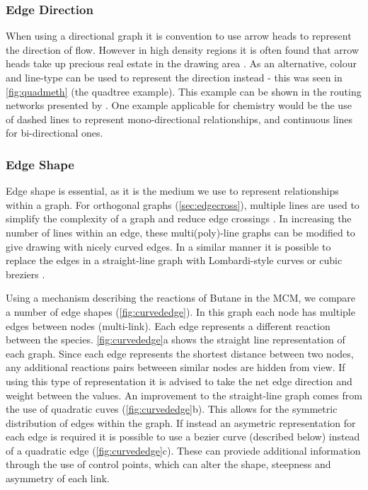 \subsubsection{Edge Direction}
When using a directional graph it is convention to use arrow heads to represent the direction of flow. However in high density regions it is often found that arrow heads take up precious real estate in the drawing area \citep{noarredge}. As an alternative, colour and line-type can be used to represent the direction instead - this was seen in \autoref{fig:quadmeth} (the quadtree example). This example can be shown in the routing networks presented by \citep{networkrouting}. One example applicable for chemistry would be the use of dashed lines to represent mono-directional relationships, and continuous lines for bi-directional ones. 








\subsubsection{Edge Shape}
Edge shape is essential, as it is the medium we use to represent relationships within a graph. For orthogonal graphs (\autoref{sec:edgecross}), multiple lines are used to simplify the complexity of a graph and reduce edge crossings \citep{ortho}. In increasing the number of lines within an edge, these multi(poly)-line graphs can be modified to give drawing with nicely curved edges. In a similar manner it is possible to replace the edges in a straight-line graph with Lombardi-style curves or cubic breziers \citep{lombardi,bezier}. 

Using a mechanism describing the reactions of Butane in the MCM, we compare a number of edge shapes (\autoref{fig:curvededge}). In this graph each node has multiple edges between nodes (multi-link). Each edge represents a different reaction between the species. \autoref{fig:curvededge}a shows the straight line representation of each graph. Since each edge represents the shortest distance between two nodes, any additional reactions pairs betweeen similar nodes are hidden from view. If using this type of representation it is advised to take the net edge direction and weight between the values. An improvement to the straight-line graph comes from the use of quadratic cuves (\autoref{fig:curvededge}b). This allows for the symmetric distribution of edges within the graph. If instead an asymetric representation for each edge is required it is possible to use a bezier curve (described below) instead of a quadratic edge (\autoref{fig:curvededge}c). These can proviede additional information through the use of control points, which can alter the shape, steepness and asymmetry of each link. 

